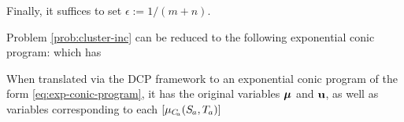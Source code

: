 \documentclass[twoside]{article}
\begin{document}
\begin{lproof}
    Finally,
    it suffices to set $\epsilon := 1/(m+n)$.
    

\end{lproof}

\begin{lproof}\label{proof:main}
    
    Problem \eqref{prob:cluster-inc}
    can be reduced to the following exponential conic program:
    which has
    
    
    When translated via the DCP framework to 
    an exponential conic program of the form \eqref{eq:exp-conic-program}, 
    it has the original variables $\boldsymbol\mu$ and $\mathbf{u}$, as well as variables corresponding
    to each $[\mu_{C_{\!a}}(\Src a, \Tgt a)]$
    
\end{lproof}

\subsection{}
\end{document}
